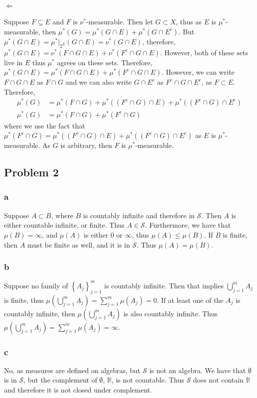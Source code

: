 \documentclass{article}
\theoremstyle{definition}
\numberwithin{theorem}{section}
\numberwithin{equation}{section}
\newcommand{\sig}{\mathcal{S}}
\begin{document}
\paragraph{$\Leftarrow$} 
Suppose $F \subseteq E$ and $F$ is $\nu^*$-measurable. Then let $G \subset X$, thus as $E$ is $\mu^*$-measurable, then $\mu^*(G) = \mu^*(G \cap E) + \mu^*(G \cap E^c)$. But $\mu^*(G \cap E) = \mu^*|_{2^E}(G \cap E) = \nu^*(G \cap E)$, therefore, $\mu^*(G \cap E) = \nu^*(F \cap G \cap E) + \nu^*(F^c \cap G \cap E)$. However, both of these sets live in $E$ thus $\mu^*$ agrees on these sets. Therefore, $\mu^*(G \cap E) = \mu^*(F \cap G \cap E) + \mu^*(F^c \cap G \cap E)$. However, we can write $F \cap G \cap E$ as $F \cap G$ and we can also write $G \cap E^c$ as $F^c \cap G \cap E^c$, as $F \subset E$. Therefore, 
\begin{align*}
	\mu^*(G) &= \mu^*(F \cap G) + \mu^*((F^c \cap G) \cap E) + \mu^*((F^c \cap G) \cap E^c)\\
	\mu^*(G) &= \mu^*(F \cap G) + \mu^*(F^c \cap G)
\end{align*}
where we use the fact that $\mu^*(F^c \cap G) = \mu^*((F^c \cap G) \cap E) + \mu^*((F^c \cap G) \cap E^c)$ as $E$ is $\mu^*$-measurable. As $G$ is arbitrary, then $F$ is $\mu^*$-measurable. 
\subsection{Problem 2}
\subsubsection{a}
Suppose $A \subset B$, where $B$ is countably infinite and therefore in $\sig$. Then $A$ is either countable infinite, or finite. Thus $A \in \sig$. Furthermore, we have that $\mu(B) = \infty$, and $\mu(A)$ is either $0$ or $\infty$, thus $\mu(A) \leq \mu(B)$. If $B$ is finite, then $A$ must be finite as well, and it is in $\sig$. Thus $\mu(A) = \mu(B)$.
\subsubsection{b}
Suppose no family of $\left\lbrace A_j \right\rbrace_{j = 1}^m$ is countably infinite. Then that implies $\bigcup_{j = 1}^m A_j$ is finite, thus $\mu(\bigcup_{j = 1}^m A_j) = \sum_{j = 1}^m \mu(A_j) = 0$. If at least one of the $A_j$ is countably infinite, then $\mu(\bigcup_{j = 1}^m A_j)$ is also countably infinite. Thus $\mu(\bigcup_{j = 1}^m A_j) = \sum_{j = 1}^m \mu(A_j) = \infty$.
\subsubsection{c}
No, as measures are defined on algebras, but $\sig$ is not an algebra. We have that $\emptyset$ is in $\sig$, but the complement of $\emptyset$, $\mathbb{R}$, is not countable. Thus $\sig$ does not contain $\mathbb{R}$ and therefore it is not closed under complement.
\end{document}
